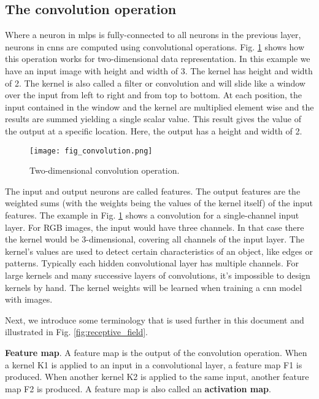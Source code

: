 \subsection{The convolution operation}
Where a neuron in \acrshort{mlp}s is fully-connected to all neurons in the previous layer, neurons in \acrshort{cnn}s are computed using convolutional operations. Fig. \ref{fig:convolution} shows how this operation works for two-dimensional data representation. In this example we have an input image with height and width of 3. The kernel has height and width of 2. The kernel is also called a filter or convolution and will slide like a window over the input from left to right and from top to bottom. At each position, the input contained in the window and the kernel are multiplied element wise and the results are summed yielding a single scalar value. This result gives the value of the output at a specific location. Here, the output has a height and width of 2.
\begin{figure}[ht]
    \begin{center}       
    \texttt{[image: fig\_convolution.png]}
    \caption{Two-dimensional convolution operation.}
    \label{fig:convolution}
    \end{center}
\end{figure}

The input and output neurons are called features. The output features are the weighted sums (with the weights being the values of the kernel itself) of the input features. The example in Fig. \ref{fig:convolution} shows a convolution for a single-channel input layer. For RGB images, the input would have three channels. In that case there the kernel would be 3-dimensional, covering all channels of the input layer. The kernel's values are used to detect certain characteristics of an object, like edges or patterns. Typically each hidden convolutional layer has multiple channels. For large kernels and many successive layers of convolutions, it's impossible to design kernels by hand. The kernel weights will be learned when training a \acrshort{cnn} model with images.

Next, we introduce some terminology that is used further in this document and illustrated in Fig. \ref{fig:receptive_field}.

\textbf{Feature map}. A feature map is the output of the convolution operation. When a kernel K1 is applied to an input in a convolutional layer, a feature map F1 is produced. When another kernel K2 is applied to the same input, another feature map F2 is produced. A feature map is also called an \textbf{activation map}.

